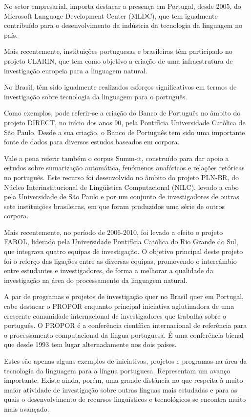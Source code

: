 \begin{multicols}{2}
No setor empresarial, importa destacar a presença em Portugal, desde 2005, 
do Microsoft Language Development Center (MLDC), que tem igualmente contribuído 
para o desenvolvimento da indústria da tecnologia da linguagem no país.

Mais recentemente, instituições portuguesas e brasileiras têm participado no projeto CLARIN, 
que tem como objetivo a criação de uma infraestrutura de investigação europeia para a linguagem natural.

No Brasil, têm sido igualmente realizados esforços significativos em termos de investigação sobre tecnologia da linguagem para o português. 

Como exemplos, pode referir-se a criação do Banco de Português no âmbito do projeto DIRECT, no início dos anos 90, 
pela Pontifícia Universidade Católica de São Paulo. 
Desde a sua criação, o Banco de Português tem sido uma importante fonte de dados para diversos estudos 
baseados em corpora. 

Vale a pena referir também o corpus Summ-it, construído para dar apoio a estudos sobre sumarização 
automática, fenómenos anafóricos e relações retóricas no português. 
Este recurso foi desenvolvido no âmbito do projeto PLN-BR, do Núcleo Interinstitucional de Lingüística Computacional (NILC), 
levado a cabo pela Universidade de São Paulo e por um conjunto de investigadores de outras sete instituições brasileiras,
em que foram produzidos uma série de outros corpora. 

Mais recentemente, no período de 2006-2010, foi levado a efeito o projeto FAROL, liderado pela Universidade Pontifícia Católica 
do Rio Grande do Sul, que integrava quatro equipas de investigação. 
O objetivo principal deste projeto foi o reforço das ligações entre as diversas equipas, 
promovendo o intercâmbio entre estudantes e investigadores, de forma a melhorar 
a qualidade da investigação na área do processamento da linguagem natural.

A par de programas e projetos de investigação quer no Brasil quer em Portugal, 
cabe destacar o PROPOR enquanto principal iniciativa aglutinadora de uma crescente
comunidade internacional de investigadores que trabalha sobre o português.
O PROPOR é a conferência científica internacional de referência para o processamento 
computacional da língua portuguesa. É uma conferência bienal que desde 1993 
tem lugar alternadamente nos dois países.

Estes são apenas alguns exemplos de iniciativas, projetos e programas na área da tecnologia 
da linguagem para a língua portuguesa. 
Representam um avanço importante.
Existe ainda, porém, uma grande distância no que res\-pei\-ta à muito maior
atividade de investigação sobre outras línguas mais estudadas 
e para as quais o desenvolvimento
de recursos linguísticos e tecnológicos se encontra muito mais avançado.


\end{multicols}
